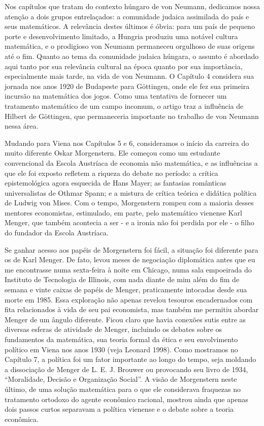\documentclass[12pt]{article}
\begin{document}
Nos capítulos que tratam do contexto húngaro de von Neumann, dedicamos nossa atenção a dois grupos entrelaçados: a comunidade judaica assimilada do país e seus matemáticos. A relevância destes últimos é óbvia: para um país de pequeno porte e desenvolvimento limitado, a Hungria produziu uma notável cultura matemática, e o prodigioso von Neumann permaneceu orgulhoso de suas origens até o fim. Quanto ao tema da comunidade judaica húngara, o assunto é abordado aqui tanto por sua relevância cultural na época quanto por sua importância, especialmente mais tarde, na vida de von Neumann. O Capítulo 4 considera sua jornada nos anos 1920 de Budapeste para Göttingen, onde ele fez sua primeira incursão na matemática dos jogos. Como uma tentativa de fornecer um tratamento matemático de um campo incomum, o artigo traz a influência de Hilbert de Göttingen, que permaneceria importante no trabalho de von Neumann nessa área.

Mudando para Viena nos Capítulos 5 e 6, consideramos o início da carreira do muito diferente Oskar Morgenstern. Ele começou como um estudante convencional da Escola Austríaca de economia não matemática, e as influências a que ele foi exposto refletem a riqueza do debate no período: a crítica epistemológica agora esquecida de Hans Mayer; as fantasias românticas universalistas de Othmar Spann; e a mistura de crítica teórica e didática política de Ludwig von Mises. Com o tempo, Morgenstern rompeu com a maioria desses mentores economistas, estimulado, em parte, pelo matemático vienense Karl Menger, que também acontecia a ser - e a ironia não foi perdida por ele - o filho do fundador da Escola Austríaca.

Se ganhar acesso aos papéis de Morgenstern foi fácil, a situação foi diferente para os de Karl Menger. De fato, levou meses de negociação diplomática antes que eu me encontrasse numa sexta-feira à noite em Chicago, numa sala empoeirada do Instituto de Tecnologia de Illinois, com nada diante de mim além do fim de semana e vinte caixas de papéis de Menger, praticamente intocadas desde sua morte em 1985. Essa exploração não apenas revelou tesouros encadernados com fita relacionados à vida de seu pai economista, mas também me permitiu abordar Menger de um ângulo diferente. Ficou claro que havia conexões sutis entre as diversas esferas de atividade de Menger, incluindo os debates sobre os fundamentos da matemática, sua teoria formal da ética e seu envolvimento político em Viena nos anos 1930 (veja Leonard 1998). Como mostramos no Capítulo 7, a política foi um fator importante ao longo do tempo, seja moldando a dissociação de Menger de L. E. J. Brouwer ou provocando seu livro de 1934, “Moralidade, Decisão e Organização Social”. A visão de Morgenstern neste último, de uma solução matemática para o que ele considerava fraquezas no tratamento ortodoxo do agente econômico racional, mostrou ainda que apenas dois passos curtos separavam a política vienense e o debate sobre a teoria econômica.
\end{document}
